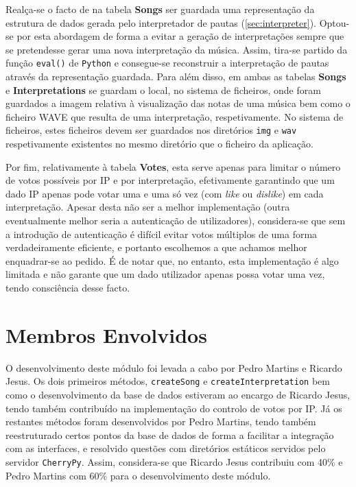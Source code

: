 \documentclass[a4paper,11pt,openright,oneside]{report}
\begin{document}
Realça-se o facto de na tabela \textbf{Songs} ser guardada uma representação da estrutura de dados gerada pelo interpretador de pautas (\ref{sec:interpreter}). Optou-se por esta abordagem de forma a evitar a geração de interpretações sempre que se pretendesse gerar uma nova interpretação da música. Assim, tira-se partido da função \verb|eval()| de \verb|Python| e consegue-se reconstruir a interpretação de pautas através da representação guardada. Para além disso, em ambas as tabelas \textbf{Songs} e \textbf{Interpretations} se guardam o local, no sistema de ficheiros, onde foram guardados a imagem relativa à visualização das notas de uma música bem como o ficheiro WAVE que resulta de uma interpretação, respetivamente. No sistema de ficheiros, estes ficheiros devem ser guardados nos diretórios \verb|img| e \verb|wav| respetivamente existentes no mesmo diretório que o ficheiro da aplicação.

Por fim, relativamente à tabela \textbf{Votes}, esta serve apenas para limitar o número de votos possíveis por IP e por interpretação, efetivamente garantindo que um dado IP apenas pode votar uma e uma só vez (com \textit{like} ou \textit{dislike}) em cada interpretação. Apesar desta não ser a melhor implementação (outra eventualmente melhor seria a autenticação de utilizadores), considera-se que sem a introdução de autenticação é difícil evitar votos múltiplos de uma forma verdadeiramente eficiente, e portanto escolhemos a que achamos melhor enquadrar-se ao pedido. É de notar que, no entanto, esta implementação é algo limitada e não garante que um dado utilizador apenas possa votar uma vez, tendo consciência desse facto.

\section*{Membros Envolvidos}

O desenvolvimento deste módulo foi levada a cabo por Pedro Martins e Ricardo Jesus. Os dois primeiros métodos, \verb|createSong| e \verb|createInterpretation| bem como o desenvolvimento da base de dados estiveram ao encargo de Ricardo Jesus, tendo também contribuído na implementação do controlo de votos por IP. Já os restantes métodos foram desenvolvidos por Pedro Martins, tendo também reestruturado certos pontos da base de dados de forma a facilitar a integração com as interfaces, e resolvido questões com diretórios estáticos servidos pelo servidor \verb|CherryPy|. Assim, considera-se que Ricardo Jesus contribuiu com 40\% e Pedro Martins com 60\% para o desenvolvimento deste módulo.
\end{document}
